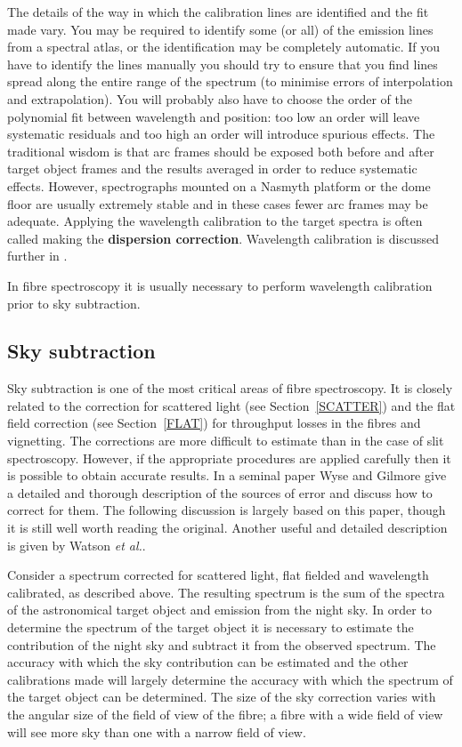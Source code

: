 \documentclass[chapters,twoside,11pt]{starlink}
\begin{document}
The details of the way in which the calibration lines are identified
and the fit made vary.  You may be required to identify some (or all)
of the emission lines from a spectral atlas, or the identification
may be completely automatic.  If you have to identify the lines
manually you should try to ensure that you find lines spread along
the entire range of the spectrum (to minimise errors of interpolation
and extrapolation).  You will probably also have to choose the order of
the polynomial fit between wavelength and position: too low an order
will leave systematic residuals and too high an order will introduce
spurious effects.  The traditional wisdom is that arc frames should be
exposed both before and after target object frames and the results averaged
in order to reduce systematic effects.  However, spectrographs mounted on
a Nasmyth platform or the dome floor are usually extremely stable and in
these cases fewer arc frames may be adequate.  Applying the wavelength
calibration to the target spectra is often called making the \textbf{dispersion
correction}.  Wavelength calibration is discussed further in .

In fibre spectroscopy it is usually necessary to perform wavelength
calibration prior to sky subtraction.

\subsection{\label{SKYSUB}Sky subtraction}

Sky subtraction is one of the most critical areas of fibre spectroscopy.
It is closely related to the correction for scattered light (see
Section~\ref{SCATTER}) and the flat field correction (see Section~\ref{FLAT})
for throughput losses in the fibres and vignetting.  The corrections
are more difficult to estimate than in the case of slit spectroscopy.
However, if the appropriate procedures are applied carefully then it is
possible to obtain accurate results.  In a seminal paper Wyse and
Gilmore\cite{WYSE92} give a detailed and thorough description of the
sources of error and discuss how to correct for them.  The following
discussion is largely based on this paper, though it is still well
worth reading the original.  Another useful and detailed description
is given by Watson \textit{et al.}\/\cite{WATSON98}.

Consider a spectrum corrected for scattered light, flat fielded and
wavelength calibrated, as described above.  The resulting spectrum is
the sum of the spectra of the astronomical target object and emission
from the night sky.  In order to determine the spectrum of the target
object it is necessary to estimate the contribution of the night sky and
subtract it from the observed spectrum.  The accuracy with which the sky
contribution can be estimated and the other calibrations made will largely
determine the accuracy with which the spectrum of the target object can be
determined.  The size of the sky correction varies with the angular size
of the field of view of the fibre; a fibre with a wide field of view will
see more sky than one with a narrow field of view.
\end{document}
